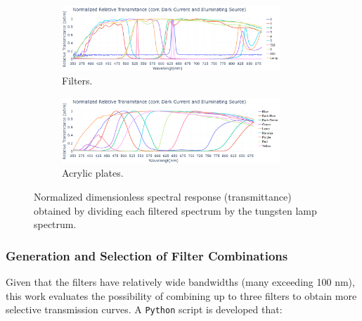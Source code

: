 \begin{figure}[H]
    \centering
    \begin{subfigure}{\textwidth}
        \centering
        \includegraphics[trim=0mm 0mm 0mm 25mm, clip, width=0.9\textwidth]{Figures/C3/filtros_respuestaspec.png}
        \caption{Filters.}
        \label{fig:filtros_espectros}
    \end{subfigure}
    \vspace{1em}
    \begin{subfigure}{\textwidth}
        \centering
        \includegraphics[trim=0mm 0mm 0mm 25mm, clip, width=0.9\textwidth]{Figures/C3/laminas_respuestaspec.png}
        \caption{Acrylic plates.}
        \label{fig:laminas_espectros}
    \end{subfigure}
    \caption{Normalized dimensionless spectral response (transmittance) obtained by dividing each filtered spectrum by the tungsten lamp spectrum.}
    \label{ig:filtros_laminas_espectros_relativos}
\end{figure}

\subsubsection{Generation and Selection of Filter Combinations}
\label{subsub:combinaciones_filtros}

Given that the filters have relatively wide bandwidths (many exceeding 100 nm), this work evaluates the possibility of combining up to three filters to obtain more selective transmission curves. A \texttt{Python} script is developed that:

